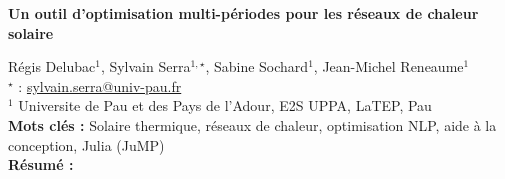 


    \newpage

\BgThispage

%
\begin{flushleft}
\addtocounter{section}{1}
{\Large \textbf{Un outil d'optimisation multi-périodes pour les réseaux de chaleur solaire}}\label{ref:4}
\end{flushleft}
%
Régis Delubac$^{1}$, Sylvain Serra$^{1,\star}$, Sabine Sochard$^{1}$, Jean-Michel Reneaume$^{1}$\\[2mm]
$^{\star}$ \Letter : \url{sylvain.serra@univ-pau.fr}\\[2mm]
{\footnotesize $^{1}$ Universite de Pau et des Pays de l'Adour, E2S UPPA, LaTEP, Pau}\\
[4mm]
%
\noindent \textbf{Mots clés : } Solaire thermique, réseaux de chaleur, optimisation NLP, aide à la conception, Julia (JuMP)\\[4mm]
%
\noindent \textbf{Résumé : } 

